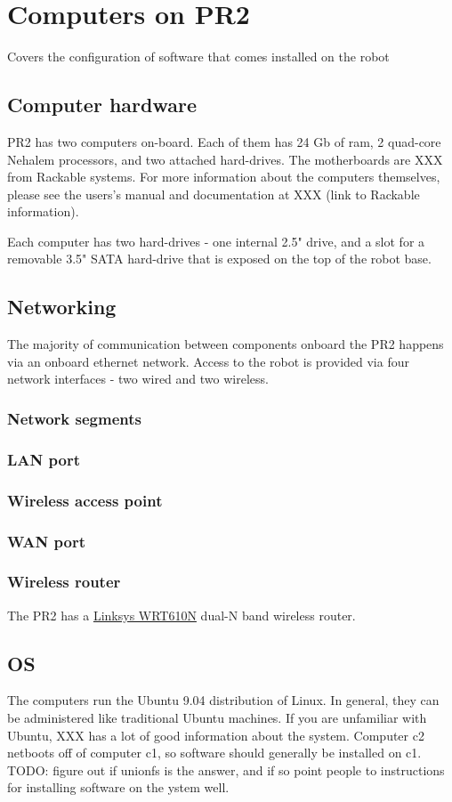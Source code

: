 \chapter{Computers on PR2}
Covers the configuration of software that comes installed on the robot
\section{Computer hardware}
PR2 has two computers on-board.  Each of them has 24 Gb of ram, 2 quad-core Nehalem processors, and two attached hard-drives.  The motherboards are XXX from Rackable systems.  For more information about the computers themselves, please see the users's manual and documentation at XXX (link to Rackable information).

Each computer has two hard-drives - one internal 2.5" drive, and a slot for a removable 3.5" SATA hard-drive that is exposed on the top of the robot base.
\section{Networking}
The majority of communication between components onboard the PR2 happens via an onboard ethernet network.
Access to the robot is provided via four network interfaces - two wired and two wireless.
\subsection{Network segments}
\subsection{LAN port}
\subsection{Wireless access point}
\subsection{WAN port}
\subsection{Wireless router}
The PR2 has a \href{http://www.linksysbycisco.com/US/en/products/WRT610N}{Linksys WRT610N} 
dual-N band wireless router.

\section{OS}
The computers run the Ubuntu 9.04 distribution of Linux.  In general, they can be administered like traditional Ubuntu machines.  If you are unfamiliar with Ubuntu, XXX has a lot of good information about the system.  Computer c2 netboots off of computer c1, so software should generally be installed on c1.  TODO: figure out if unionfs is the answer, and if so point people to instructions for installing software on the ystem well.
